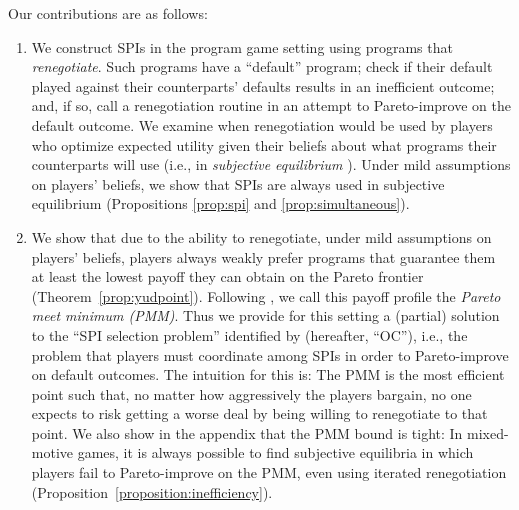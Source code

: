 \documentclass[sigconf]{aamas}
\theoremstyle{definition}
\begin{document}
Our contributions are as
follows: 

\begin{enumerate}
    \item We construct SPIs in the program game setting
    using programs that \textit{renegotiate}. Such programs
    have a ``default'' program; check if their default
    played against their counterparts' defaults
    results in an inefficient outcome; and, if so, 
    call a renegotiation routine in an attempt to 
    Pareto-improve on the default outcome. 
    We examine when renegotiation would be
    used by players who optimize
    expected utility given their beliefs about 
    what programs
    their counterparts will use (i.e., in \textit{subjective equilibrium}
    \citep{subjective}).
    Under
    mild assumptions
    on players' beliefs, we show that
    SPIs are
    always used in subjective equilibrium
    (Propositions \ref{prop:spi} and \ref{prop:simultaneous}).
    \item We show that due
    to the ability to renegotiate, 
    under mild assumptions on players' beliefs,
    players
    always
    weakly prefer 
    programs
    that guarantee them
    at least
    the lowest payoff they can obtain
    on the Pareto frontier
    (Theorem~\ref{prop:yudpoint}). Following 
    \citet{Rabin1991AMO}, we call this
    payoff profile the \textit{Pareto meet minimum (PMM)}.
    Thus we provide for this setting a (partial) solution to the 
    ``SPI selection problem'' identified by 
    \citet{oesterheld2021safe}
    (hereafter, ``OC''), i.e., the problem that
    players must coordinate among SPIs in order to 
    Pareto-improve on default outcomes.
    The intuition for this is:
    The PMM is the most efficient
    point such that,
    no matter how aggressively the players bargain, no one expects to risk getting a worse
    deal by being willing to 
    renegotiate to that point.
    We also show in the appendix that the PMM bound is tight:
    In 
    mixed-motive games, 
    it is always 
    possible to find subjective equilibria
    in which players fail to Pareto-improve on the 
    PMM, even using iterated renegotiation
    (Proposition~\ref{proposition:inefficiency}). 
\end{enumerate}
\end{document}
